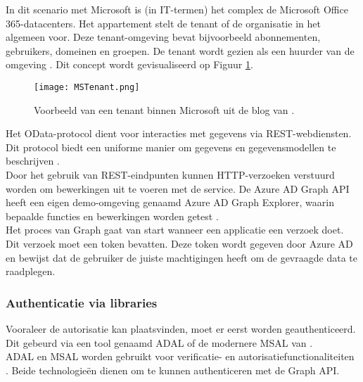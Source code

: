 In dit scenario met Microsoft is (in \ac{IT}-termen) het complex de Microsoft Office 365-datacenters. Het appartement stelt de tenant of de organisatie in het algemeen voor. Deze tenant-omgeving bevat bijvoorbeeld abonnementen, gebruikers, domeinen en groepen. De tenant wordt gezien als een huurder van de omgeving \autocite{Saxton2015}. Dit concept wordt gevisualiseerd op Figuur \ref{mst}. \\

\begin{figure}[h!]
    \texttt{[image: MSTenant.png]}
    \caption[Voorbeeld Microsoft tenant]{Voorbeeld van een tenant binnen Microsoft uit de blog van \textcite{Saxton2015}.}
    \label{mst}
\end{figure}

Het OData-protocol dient voor interacties met gegevens via \ac{REST}-webdiensten. Dit protocol biedt een uniforme manier om gegevens en gegevensmodellen te beschrijven \autocite{OData2023}. \\

Door het gebruik van \ac{REST}-eindpunten kunnen \ac{HTTP}-verzoeken verstuurd worden om bewerkingen uit te voeren met de service. De Azure \ac{AD} Graph \ac{API} heeft een eigen demo-omgeving genaamd Azure \ac{AD} Graph Explorer, waarin bepaalde functies en bewerkingen worden getest \autocite{Microsoft}. \\

Het proces van Graph gaat van start wanneer een applicatie een verzoek doet. Dit verzoek moet een token bevatten. Deze token wordt gegeven door Azure \ac{AD} en bewijst dat de gebruiker de juiste machtigingen heeft om de gevraagde data te raadplegen.



\subsubsection{Authenticatie via libraries}

Vooraleer de autorisatie kan plaatsvinden, moet er eerst worden geauthenticeerd. Dit gebeurd via een tool genaamd \ac{ADAL} of de modernere \ac{MSAL} van \textcite{Microsoft2022d}. \\

\ac{ADAL} en \ac{MSAL} worden gebruikt voor verificatie- en autorisatiefunctionaliteiten \autocite{Ooms2022}. Beide technologieën dienen om te kunnen authenticeren met de Graph \ac{API}. \\ 

